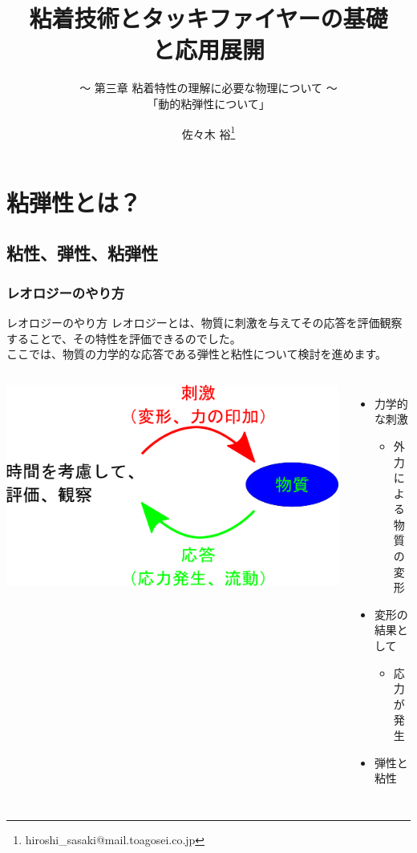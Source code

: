 \documentclass[12pt, dvipdfmx]{beamer}
\title{粘着技術とタッキファイヤーの基礎\\と応用展開}
\subtitle{ ～ 第三章 粘着特性の理解に必要な物理について ～\\「動的粘弾性について」}
\author[東亞合成 佐々木]{佐々木 裕\thanks{hiroshi\_sasaki@mail.toagosei.co.jp}}
\institute[東亞合成]{東亞合成株式会社}
\date{}
\begin{document}
\maketitle

\begin{frame} 
    \tableofcontents[]
\end{frame} 

\section{粘弾性とは？}
\subsection{粘性、弾性、粘弾性}
\begin{frame}
	\frametitle{レオロジーのやり方}
	\begin{block}{レオロジーのやり方}
		レオロジーとは、物質に刺激を与えてその応答を評価観察することで、その特性を評価できるのでした。\\
		ここでは、物質の力学的な応答である弾性と粘性について検討を進めます。
	\end{block}
	\begin{columns}[T, onlytextwidth]
			\includegraphics[width=\textwidth]{Rheo_method.png}
			\begin{itemize}
				\item 力学的な刺激
				\begin{itemize}
					\item 外力による\\物質の変形
				\end{itemize}
				\item 変形の結果として
				\begin{itemize}
					\item 応力が発生
				\end{itemize}
				\item 弾性と粘性
			\end{itemize}
	\end{columns}
\end{frame}
\end{document}
